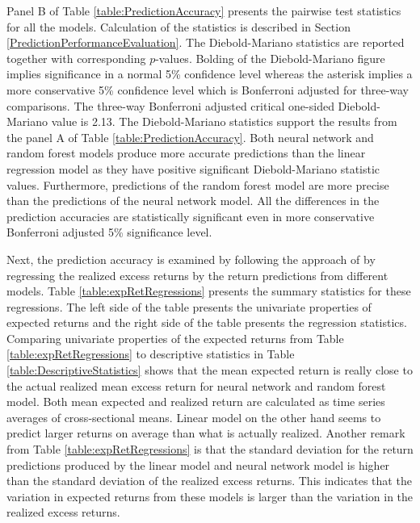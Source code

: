 \documentclass[12pt]{article}
\begin{document}
Panel B of Table \ref{table:PredictionAccuracy} presents the pairwise \citet{Diebold1995} test statistics for all the models. Calculation of the statistics is described in Section \ref{PredictionPerformanceEvaluation}. The Diebold-Mariano statistics are reported together with corresponding $p$-values. Bolding of the Diebold-Mariano figure implies significance in a normal 5\% confidence level whereas the asterisk implies a more conservative 5\% confidence level which is Bonferroni adjusted for three-way comparisons. The three-way Bonferroni adjusted critical one-sided Diebold-Mariano value is 2.13. The Diebold-Mariano statistics support the results from the panel A of Table \ref{table:PredictionAccuracy}. Both neural network and random forest models produce more accurate predictions than the linear regression model as they have positive significant Diebold-Mariano statistic values. Furthermore, predictions of the random forest model are more precise than the predictions of the neural network model. All the differences in the prediction accuracies are statistically significant even in more conservative Bonferroni adjusted 5\% significance level. \par

Next, the prediction accuracy is examined by following the approach of \citet{Lewellen2015} by regressing the realized excess returns by the return predictions from different models.\footnotemark {} Table \ref{table:expRetRegressions} presents the summary statistics for these regressions. The left side of the table presents the univariate properties of expected returns and the right side of the table presents the regression statistics. Comparing univariate properties of the expected returns from Table \ref{table:expRetRegressions} to descriptive statistics in Table \ref{table:DescriptiveStatistics} shows that the mean expected return is really close to the actual realized mean excess return for neural network and random forest model. Both mean expected and realized return are calculated as time series averages of cross-sectional means. Linear model on the other hand seems to predict larger returns on average than what is actually realized. Another remark from Table \ref{table:expRetRegressions} is that the standard deviation for the return predictions produced by the linear model and neural network model is higher than the standard deviation of the realized excess returns. This indicates that the variation in expected returns from these models is larger than the variation in the realized excess returns. \par
\end{document}
